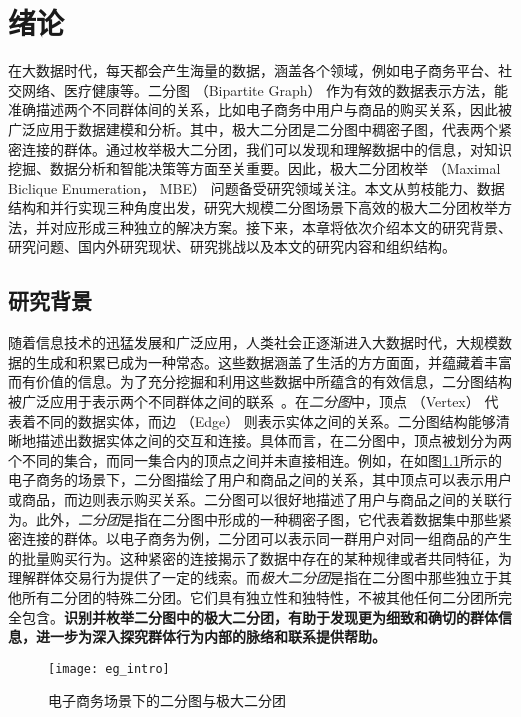 \chapter{绪论}

在大数据时代，每天都会产生海量的数据，涵盖各个领域，例如电子商务平台、社交网络、医疗健康等。二分图 （Bipartite Graph） 作为有效的数据表示方法，能准确描述两个不同群体间的关系，比如电子商务中用户与商品的购买关系，因此被广泛应用于数据建模和分析。其中，极大二分团是二分图中稠密子图，代表两个紧密连接的群体。通过枚举极大二分团，我们可以发现和理解数据中的信息，对知识挖掘、数据分析和智能决策等方面至关重要。因此，极大二分团枚举 （Maximal Biclique Enumeration， MBE） 问题备受研究领域关注。本文从剪枝能力、数据结构和并行实现三种角度出发，研究大规模二分图场景下高效的极大二分团枚举方法，并对应形成三种独立的解决方案。接下来，本章将依次介绍本文的研究背景、研究问题、国内外研究现状、研究挑战以及本文的研究内容和组织结构。


\section{研究背景}

随着信息技术的迅猛发展和广泛应用，人类社会正逐渐进入大数据时代，大规模数据的生成和积累已成为一种常态。这些数据涵盖了生活的方方面面，并蕴藏着丰富而有价值的信息。为了充分挖掘和利用这些数据中所蕴含的有效信息，二分图结构被广泛应用于表示两个不同群体之间的联系~\cite{bipartite22}。在\emph{二分图}中，顶点 （Vertex） 代表着不同的数据实体，而边 （Edge） 则表示实体之间的关系。二分图结构能够清晰地描述出数据实体之间的交互和连接。具体而言，在二分图中，顶点被划分为两个不同的集合，而同一集合内的顶点之间并未直接相连。例如，在如图\ref{fig:eg_intro}所示的电子商务的场景下，二分图描绘了用户和商品之间的关系，其中顶点可以表示用户或商品，而边则表示购买关系。二分图可以很好地描述了用户与商品之间的关联行为。此外，\emph{二分团}是指在二分图中形成的一种稠密子图，它代表着数据集中那些紧密连接的群体。以电子商务为例，二分团可以表示同一群用户对同一组商品的产生的批量购买行为。这种紧密的连接揭示了数据中存在的某种规律或者共同特征，为理解群体交易行为提供了一定的线索。而\emph{极大二分团}是指在二分图中那些独立于其他所有二分团的特殊二分团。它们具有独立性和独特性，不被其他任何二分团所完全包含。\textbf{识别并枚举二分图中的极大二分团，有助于发现更为细致和确切的群体信息，进一步为深入探究群体行为内部的脉络和联系提供帮助。}

\begin{figure} [ht]
  \centering
  \vspace{0.05in}
  \texttt{[image: eg\_intro]}
  \vspace{0.05in}
  \caption{电子商务场景下的二分图与极大二分团}
  \label{fig:eg_intro}
\end{figure}



